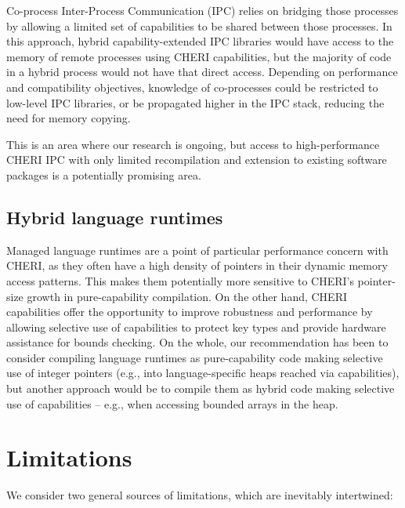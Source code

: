 \documentclass[12pt,twoside,openright,a4paper]{article}
\newcommand{\note}[2]{{\color{blue}[ Note: #1 - #2]}}
\renewcommand{\note}[2]{\relax\ifhmode\unskip\fi}
\newcommand{\nwfnote}[1]{\note{#1}{nwf}}
\newcommand{\dcnote}[1]{\note{#1}{David}}
\begin{document}
Co-process Inter-Process Communication (IPC) relies on bridging those
processes by allowing a limited set of capabilities to be shared between those
processes.
In this approach, hybrid capability-extended IPC libraries would have access
to the memory of remote processes using CHERI capabilities, but the majority
of code in a hybrid process would not have that direct access.
Depending on performance and compatibility objectives, knowledge of
co-processes could be restricted to low-level IPC libraries, or be propagated
higher in the IPC stack, reducing the need for memory copying.

This is an area where our research is ongoing, but access to high-performance
CHERI IPC with only limited recompilation and extension to existing software
packages is a potentially promising area.

\subsection{Hybrid language runtimes}

Managed language runtimes are a point of particular performance concern with
CHERI, as they often have a high density of pointers in their dynamic memory
access patterns.
This makes them potentially more sensitive to CHERI's pointer-size growth in
pure-capability compilation.
On the other hand, CHERI capabilities offer the opportunity to improve
robustness and performance by allowing selective use of capabilities to
protect key types and provide hardware assistance for bounds checking.
On the whole, our recommendation has been to consider compiling language
runtimes as pure-capability code making selective use of integer pointers
(e.g., into language-specific heaps reached via capabilities), but
another approach would be to compile them as hybrid code making selective use
of capabilities -- e.g., when accessing bounded arrays in the heap.
\dcnote{It feels quite dangerous to have a single sentence about the
recommended way of doing things and a long document about the not-recommended
way.}
\nwfnote{Even if we've cited it recently, this is probably a good time to
emphatically point people at the right way~\cite{UCAM-CL-TR-947}.}


\section{Limitations}

We consider two general sources of limitations, which are inevitably
intertwined:
\end{document}
